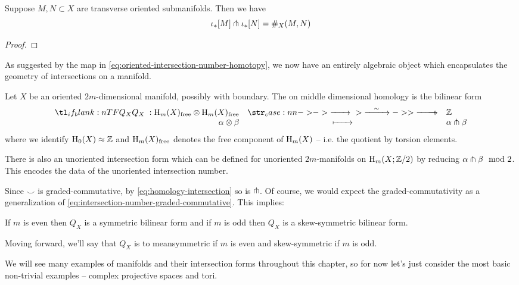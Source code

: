 \begin{theorem}
	Suppose $M,N\subset X$ are transverse oriented submanifolds. Then we have
	\[\iota_*[M]\pitchfork \iota_*[N] = \#_X(M,N)\]
\end{theorem}
\begin{proof}
\end{proof}

As suggested by the map in \cref{eq:oriented-intersection-number-homotopy}, we now have an entirely algebraic object which encapsulates the geometry of intersections on a manifold.

\begin{definition}
	Let $X$ be an oriented $2m$-dimensional manifold, possibly with boundary. The  on middle dimensional homology is the bilinear form
	\[
		\lkxfunc{Q_X}{\H_m(X)_{\mathrm{free}}\otimes \H_m(X)_{\mathrm{free}}}{\Z}{\alpha\otimes \beta}{\alpha\tnsv \beta}
	\]
	where we identify $\operatorname{H}_0(X)\approx \mathbb{Z}$ and $\operatorname{H}_m(X)_{\mathrm{free}}$ denotes the free component of $\operatorname{H}_m(X)$ -- i.e. the quotient by torsion elements.
\end{definition}

\begin{remark}
	There is also an unoriented intersection form which can be defined for unoriented $2m$-manifolds on $\operatorname{H}_m(X;\mathbb{Z}/2)$ by reducing $\alpha\pitchfork \beta\mod 2$. This encodes the data of the unoriented intersection number.
\end{remark}

Since $\smile$ is graded-commutative, by \cref{eq:homology-intersection} so is $\pitchfork$. Of course, we would expect the graded-commutativity as a generalization of \cref{eq:intersection-number-graded-commutative}. This implies:
\begin{proposition}
	If $m$ is even then $Q_X$ is a symmetric bilinear form and if $m$ is odd then $Q_X$ is a skew-symmetric bilinear form.
\end{proposition}

\begin{convention*}
Moving forward, we'll say that $Q_X$ is  to meansymmetric if $m$ is even and skew-symmetric if $m$ is odd.
\end{convention*}

We will see many examples of manifolds and their intersection forms throughout this chapter, so for now let's just consider the most basic non-trivial examples -- complex projective spaces and tori.

